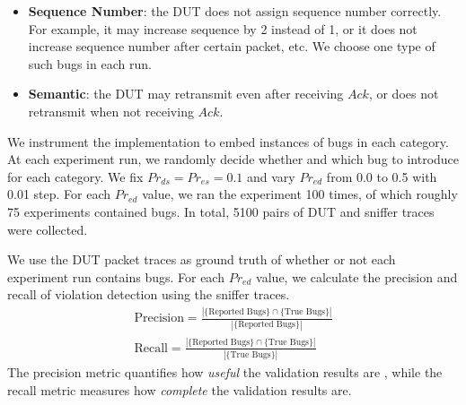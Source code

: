 \begin{itemize}
  \item \textbf{Sequence Number}: the DUT does not assign sequence number
    correctly. For example, it may increase sequence by 2 instead of 1, or it
    does not increase sequence number after certain packet, etc. We choose one
    type of such bugs in each run.
  \item \textbf{Semantic}: the DUT may retransmit even
    after receiving $Ack$, or does not retransmit when not receiving $Ack$.
\end{itemize}

We instrument the \ns{} implementation to embed instances of bugs in each
category. At each experiment run, we randomly decide whether and which bug to
introduce for each category. We fix $Pr_{ds}=Pr_{es}=0.1$ and vary $Pr_{ed}$
from 0.0 to 0.5 with 0.01 step. For each $Pr_{ed}$ value, we ran the experiment
100 times, of which roughly 75 experiments contained bugs. In total, 5100 pairs of
DUT and sniffer traces were collected.


We use the DUT packet traces as ground truth of whether or not each experiment
run contains bugs.
For each $Pr_{ed}$ value, we calculate the precision and recall of violation
detection using the sniffer traces.%
\begin{align}
  \text{Precision} = \frac{\left\vert \{\text{Reported Bugs}\} \cap \{\text{True Bugs}\}\right\vert}{\left\vert
  \{\text{Reported Bugs}\}\right\vert}\\
  \text{Recall} = \frac{\left\vert \{\text{Reported Bugs}\} \cap \{\text{True Bugs}\}\right\vert}{\left\vert
  \{\text{True Bugs}\}\right\vert}
\end{align}%
The precision metric quantifies how \textit{useful} the validation results are ,
while the recall metric measures how \textit{complete} the validation results
are.

